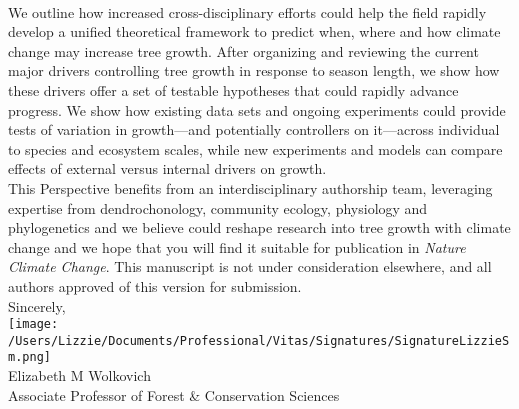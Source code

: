 \documentclass[11pt,a4paper]{article}
\begin{document}
\vspace{1.5ex}\\
We outline how increased cross-disciplinary efforts could help the field rapidly develop a unified theoretical framework to predict when, where and how climate change may increase tree growth. After organizing and reviewing the current major drivers controlling tree growth in response to season length, we show how these drivers offer a set of testable hypotheses that could rapidly advance progress. We show how existing data sets and ongoing experiments could provide tests of variation in growth---and potentially controllers on it---across individual to species and ecosystem scales, while new experiments and models can compare effects of external versus internal drivers on growth. 
\vspace{1.5ex}\\
This Perspective benefits from an interdisciplinary authorship team, leveraging expertise from dendrochonology, community ecology, physiology and phylogenetics and we believe could reshape research into tree growth with climate change and we hope that you will find it suitable for publication in \emph{Nature Climate Change}. This manuscript is not under consideration elsewhere, and all authors approved of this version for submission. 
\vspace{1.5ex}\\
Sincerely,\\

\texttt{[image: /Users/Lizzie/Documents/Professional/Vitas/Signatures/SignatureLizzieSm.png]} \\

\noindent Elizabeth M Wolkovich\\
Associate Professor of Forest \& Conservation Sciences\\ 

\newpage

\end{document}

